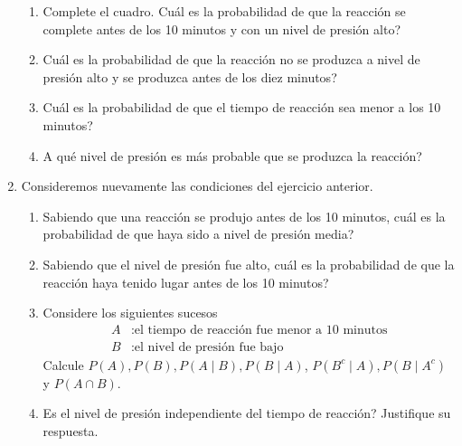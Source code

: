 \documentclass[a4paper, 11pt]{article}
\begin{document}
\begin{enumerate}
\begin{enumerate}
	\item Complete el cuadro. \textquestiondown Cu\'{a}l es la probabilidad de que
	la reacci\'{o}n se complete antes de los 10 minutos y con un nivel de
	presi\'{o}n alto?
	
	
	\item \textquestiondown Cu\'{a}l es la probabilidad de que la reacci\'{o}n no
	se produzca a nivel de presi\'{o}n alto y se produzca antes de los diez minutos?
	
	\item \textquestiondown Cu\'{a}l es la probabilidad de que el tiempo de
	reacci\'{o}n sea menor a los 10 minutos?
	


	\item \textquestiondown A qu\'{e} nivel de presi\'{o}n es m\'{a}s probable que
	se produzca la reacci\'{o}n?
	
%	
\end{enumerate}




\item Consideremos nuevamente las condiciones del ejercicio anterior.
\begin{enumerate} 
	\item Sabiendo que  una reacci\'{o}n
se produjo antes de los 10 minutos,
\textquestiondown cu\'{a}l es la probabilidad de que  haya sido a nivel de presi\'{o}n media?




	\item Sabiendo que el nivel de presi\'{o}n fue alto,
	\textquestiondown cu\'{a}l es la probabilidad de que la reacci\'{o}n haya
	tenido lugar antes de los 10 minutos?
	\item Considere los siguientes sucesos\vspace{-0.1cm}
	\begin{align*}
	A  & :\text{el tiempo de reacci\'{o}n fue menor a 10 minutos}\\
	B  & :\text{el nivel de presi\'{o}n fue bajo}%
	\end{align*}
	Calcule $P(A),P(B),P(A\mid B),P(B\mid A)$, $P\left(  B^c \mid A\right)
	,P(B\mid A^{c})$ y $P(A\cap B)$.
	
	\item \textquestiondown Es el nivel de presi\'{o}n independiente del tiempo de
	reacci\'{o}n? Justifique su respuesta.
	

\end{enumerate}
\end{enumerate}
\end{document}

